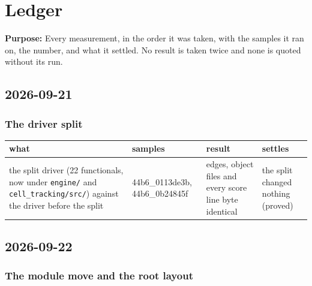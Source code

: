 \chapter{\texorpdfstring{Ledger}{Ledger}}
\label{chap:ledger}

\textbf{Purpose:} Every measurement, in the order it was taken, with the samples it ran on, the number, and what it settled. No result is taken twice and none is quoted without its run.

\section{\texorpdfstring{2026-09-21}{2026-09-21}}

\subsection{\texorpdfstring{The driver split}{The driver split}}

{\footnotesize
\setlength{\tabcolsep}{6pt}
\begin{longtable}{>{\RaggedRight\arraybackslash}p{}>{\RaggedRight\arraybackslash}p{}>{\RaggedRight\arraybackslash}p{}>{\RaggedRight\arraybackslash}p{}}
\toprule
what & samples & result & settles \\
\midrule
\endhead
the split driver (22 functionals, now under \texttt{engine/\allowbreak{}} and \texttt{cell\_\allowbreak{}tracking/\allowbreak{}src/\allowbreak{}}) against the driver before the split & 44b6\_\allowbreak{}0113de3b, 44b6\_\allowbreak{}0b24845f & edges, object files and every score line byte identical & the split changed nothing (proved) \\
\bottomrule
\end{longtable}
}

\section{\texorpdfstring{2026-09-22}{2026-09-22}}

\subsection{\texorpdfstring{The module move and the root layout}{The module move and the root layout}}

